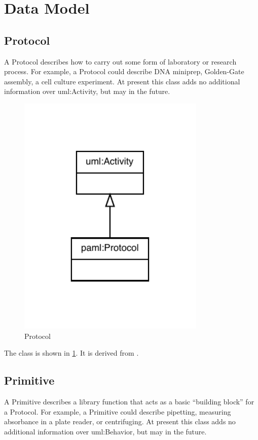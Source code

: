 %
\normalsize%
\section{Data Model}%
\label{sec:DataModel}%
\subsection{Protocol}%
\label{sec:paml:Protocol}%
A Protocol describes how to carry out some form of laboratory or research process.
              For example, a Protocol could describe DNA miniprep, Golden-Gate assembly, a cell culture experiment.
              At present this class adds no additional information over uml:Activity, but may in the future.%
\linebreak%
\linebreak%


\begin{figure}[h!]%
\centering%
\includegraphics[width=0.8\textwidth]{paml_classes/Protocol_abstraction_hierarchy.pdf}%
\caption{Protocol}%
\label{fig:Protocol}%
\end{figure}

%
The  class is shown in \ref{fig:Protocol}. It is derived from .%
%
\subsection{Primitive}%
\label{sec:paml:Primitive}%
A Primitive describes a library function that acts as a basic ``building block'' for a Protocol.
              For example, a Primitive could describe pipetting, measuring absorbance in a plate reader, or centrifuging.
              At present this class adds no additional information over uml:Behavior, but may in the future.%
\linebreak%
\linebreak%


